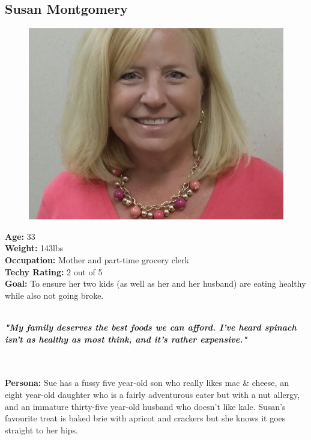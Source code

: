 \documentclass[a4paper,12pt]{article}
\begin{document}
\begin{appendices}
\subsection{Susan Montgomery}
\begin{figure}
  \begin{center}
	\includegraphics[scale=0.23]{Susan.jpg}
  \end{center}
\end{figure}
\textbf{Age:} 33\\
\textbf{Weight:} 143lbs\\
\textbf{Occupation:} Mother and part-time grocery clerk\\
\textbf{Techy Rating:} 2 out of 5\\
\textbf{Goal:} To ensure her two kids (as well as her and her husband) are eating healthy while also not going broke.\\
\\
\begin{large}
\textbf{\textit{"My family deserves the best foods we can afford.  I've heard spinach isn't as healthy as most think, and it's rather expensive."}}
\end{large}\\\\
\textbf{Persona:} Sue has a fussy five year-old son who really likes mac \& cheese, an eight year-old daughter who is a fairly adventurous eater but with a nut allergy, and an immature thirty-five year-old husband who doesn't like kale.  Susan's favourite treat is baked brie with apricot and crackers but she knows it goes straight to her hips.\\

\end{appendices}
\end{document}
